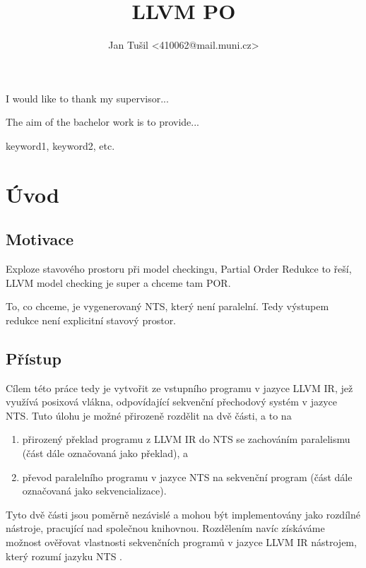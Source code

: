 \documentclass{fithesis2}
\author{Jan Tušil <410062@mail.muni.cz>}
\title{LLVM PO}
\begin{document}
\FrontMatter
\ThesisTitlePage
\begin{ThesisDeclaration}
\DeclarationText
\AdvisorName
\end{ThesisDeclaration}

\begin{ThesisThanks}
I would like to thank my supervisor...
\end{ThesisThanks}

\begin{ThesisAbstract}
The aim of the bachelor work is to provide...
\end{ThesisAbstract}
\begin{ThesisKeyWords}
keyword1, keyword2, etc.
\end{ThesisKeyWords}
\MainMatter

\chapter{Úvod}
\section{Motivace}
Exploze stavového prostoru při model checkingu, Partial Order Redukce to řeší,
LLVM model checking je super a chceme tam POR.

To, co chceme, je vygenerovaný NTS, který není paralelní. Tedy výstupem redukce
není explicitní stavový prostor.

\section{Přístup}
Cílem této práce tedy je vytvořit ze vstupního programu v jazyce LLVM IR, jež využívá posixová vlákna, odpovídající sekvenční přechodový systém v jazyce NTS. Tuto úlohu je možné přirozeně rozdělit na dvě části, a to na
\begin{enumerate}
\item přirozený překlad programu z LLVM IR do NTS se zachováním paralelismu (část dále označovaná jako překlad), a
\item převod paralelního programu v jazyce NTS na sekvenční program (část dále označovaná jako sekvencializace).
\end{enumerate}

Tyto dvě části jsou poměrně nezávislé a mohou být implementovány jako rozdílné nástroje, pracující nad společnou knihovnou. Rozdělením navíc získáváme možnost ověřovat vlastnosti sekvenčních programů v jazyce LLVM IR nástrojem, který rozumí jazyku NTS .
\end{document}
